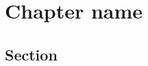 \documentclass[../main/main.tex]{subfiles}
\begin{document}
\chapter{Chapter name}

\section{Section}
\end{document}
